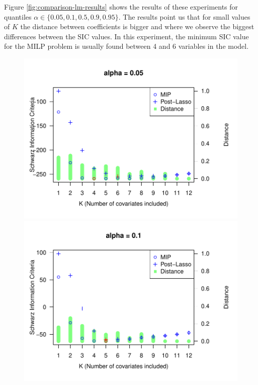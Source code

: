 Figure \ref{fig:comparison-lm-results} shows the results of these experiments for quantiles $\alpha \in \{0.05, 0.1, 0.5, 0.9, 0.95\}$. The results point us that for small values of $K$ the distance between coefficients is bigger and where we observe the biggest differences between the SIC values. In this experiment, the minimum SIC value for the MILP problem is usually found between 4 and 6 variables in the model.

\begin{figure}
	\centering
	\begin{minipage}[t]{0.4\linewidth}
		\centering
		\begin{minipage}[t]{\linewidth}
			\centering     \includegraphics[width=\textwidth]{Figuras/SIC005.pdf}
		\end{minipage}
		\begin{minipage}[b]{\linewidth}
			\centering     \includegraphics[width=\textwidth]{Figuras/SIC01.pdf}

\end{minipage}
\end{minipage}
\end{figure}
